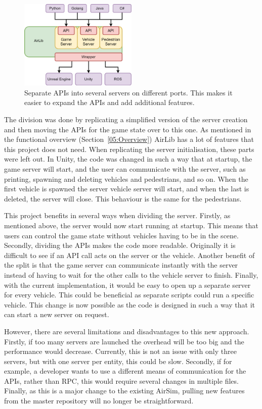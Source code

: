 \begin{figure}[h]
    \centering
    \includegraphics[width=0.5\textwidth]{05_AnalysisAndDesign/Diagrams/UpdatedOverview.png}
    \caption{Separate APIs into several servers on different ports. This makes it easier to expand the APIs and add additional features.}\label{05:SplitServer}
\end{figure}

The division was done by replicating a simplified version of the server creation and then moving the APIs for the game state over to this one. As mentioned in the functional overview (Section~\ref{05:Overview}) AirLib has a lot of features that this project does not need. When replicating the server initialisation, these parts were left out. In Unity, the code was changed in such a way that at startup, the game server will start, and the user can communicate with the server, such as printing, spawning and deleting vehicles and pedestrians, and so on. When the first vehicle is spawned the server vehicle server will start, and when the last is deleted, the server will close. This behaviour is the same for the pedestrians. 

This project benefits in several ways when dividing the server. Firstly, as mentioned above, the server would now start running at startup. This means that users can control the game state without vehicles having to be in the scene. Secondly, dividing the APIs makes the code more readable. Originally it is difficult to see if an API call acts on the server or the vehicle. Another benefit of the split is that the game server can communicate instantly with the server instead of having to wait for the other calls to the vehicle server to finish. Finally, with the current implementation, it would be easy to open up a separate server for every vehicle. This could be beneficial as separate scripts could run a specific vehicle. This change is now possible as the code is designed in such a way that it can start a new server on request. 

However, there are several limitations and disadvantages to this new approach. Firstly, if too many servers are launched the overhead will be too big and the performance would decrease. Currently, this is not an issue with only three servers, but with one server per entity, this could be slow. Secondly, if for example, a developer wants to use a different means of communication for the APIs, rather than RPC, this would require several changes in multiple files. Finally, as this is a major change to the existing AirSim, pulling new features from the master repository will no longer be straightforward. 

